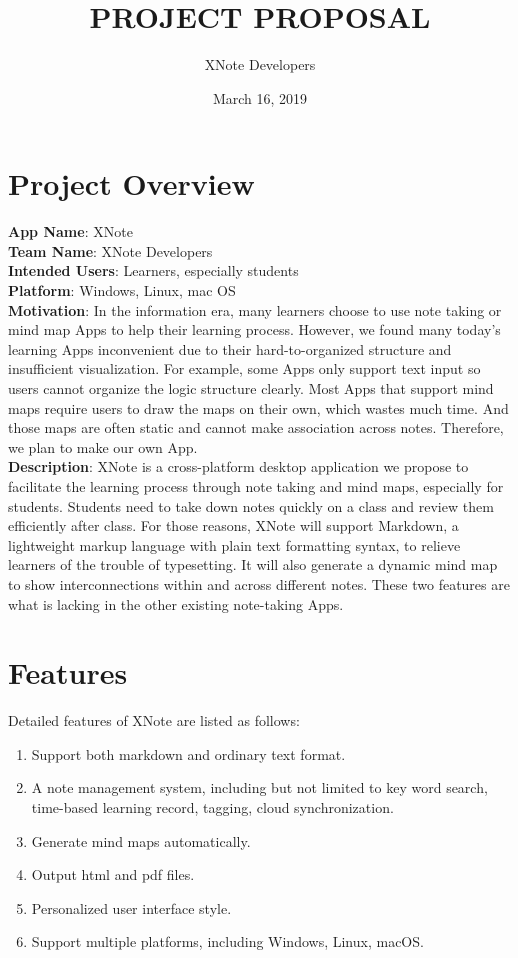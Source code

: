 \documentclass{article}
\title{PROJECT PROPOSAL}
\author{XNote Developers}
\date{March 16, 2019}
\begin{document}
\maketitle

\section{Project Overview}
\noindent\textbf{App Name}: XNote\\
\noindent\textbf{Team Name}: XNote Developers\\
\noindent\textbf{Intended Users}: Learners, especially students\\
\noindent\textbf{Platform}: Windows, Linux, mac OS\\
\noindent\textbf{Motivation}: In the information era, many learners choose to use note taking or mind map Apps to help their learning process. However, we found many today's learning Apps inconvenient due to their hard-to-organized structure and insufficient visualization. For example, some Apps only support text input so users cannot organize the logic structure clearly. Most Apps that support mind maps require users to draw the maps on their own, which wastes much time. And those maps are often static and cannot make association across notes. Therefore, we plan to make our own App.\\
\noindent\textbf{Description}: XNote is a cross-platform desktop application we propose to facilitate the learning process through note taking and mind maps, especially for students. Students need to take down notes quickly on a class and review them efficiently after class. For those reasons, XNote will support Markdown, a lightweight markup language with plain text formatting syntax, to relieve learners of the trouble of typesetting. It will also generate a dynamic mind map to show interconnections within and across different notes. These two features are what is lacking in the other existing note-taking Apps. 

\section{Features}
Detailed features of XNote are listed as follows:
\begin{enumerate}
	\item Support both markdown and ordinary text format.
	\item A note management system, including but not limited to key word search, time-based learning record, tagging, cloud synchronization.
	\item Generate mind maps automatically.
	\item Output html and pdf files.
	\item Personalized user interface style.
	\item Support multiple platforms, including Windows, Linux, macOS.
\end{enumerate}
\end{document}
